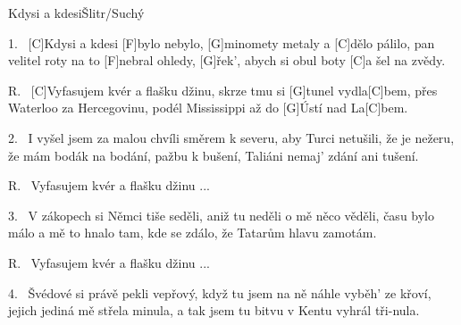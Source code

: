 \begin{song}{Kdysi a kdesi}{Šlitr/Suchý}

\begin{xverse}{1.~}
[\large C]Kdysi a kdesi [\large F]bylo nebylo,
[\large G]minomety metaly a [\large C]dělo pálilo,
pan velitel roty na to [\large F]nebral ohledy,
[\large G]{řek'}, abych si obul boty [\large C]{a šel} na zvědy.
\end{xverse}


\begin{xverse}{R.~}
[\large C]Vyfasujem kvér a flašku džinu,
skrze tmu si [\large G]tunel vydla[\large C]bem,
přes Waterloo za Hercegovinu,
podél Mississippi až do [\large G]{Ústí} nad La[\large C]bem.
\end{xverse}


\begin{xverse}{2.~}
I vyšel jsem za malou chvíli směrem k severu,
aby Turci netušili, že je nežeru,
že mám bodák na bodání, pažbu k bušení,
Taliáni nemaj' zdání ani tušení.
\end{xverse}


\begin{xverse}{R.~}
Vyfasujem kvér a flašku džinu ...
\end{xverse}


\begin{xverse}{3.~}
V zákopech si Němci tiše seděli,
aniž tu neděli o mě něco věděli,
času bylo málo a mě to hnalo tam,
kde se zdálo, že Tatarům hlavu zamotám.
\end{xverse}


\begin{xverse}{R.~}
Vyfasujem kvér a flašku džinu ...
\end{xverse}

\begin{xverse}{4.~}
Švédové si právě pekli vepřový,
když tu jsem na ně náhle vyběh' ze křoví,
jejich jediná mě střela minula,
a tak jsem tu bitvu v Kentu vyhrál tři-nula.
\end{xverse}


\end{song}


